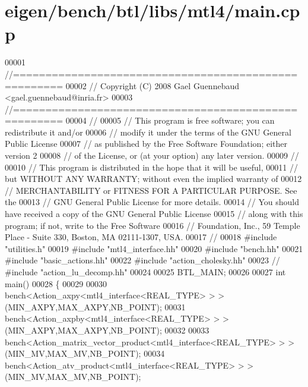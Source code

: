 \hypertarget{eigen_2bench_2btl_2libs_2mtl4_2main_8cpp_source}{}\section{eigen/bench/btl/libs/mtl4/main.cpp}
\label{eigen_2bench_2btl_2libs_2mtl4_2main_8cpp_source}

\begin{DoxyCode}
00001 \textcolor{comment}{//=====================================================}
00002 \textcolor{comment}{// Copyright (C) 2008 Gael Guennebaud <gael.guennebaud@inria.fr>}
00003 \textcolor{comment}{//=====================================================}
00004 \textcolor{comment}{//}
00005 \textcolor{comment}{// This program is free software; you can redistribute it and/or}
00006 \textcolor{comment}{// modify it under the terms of the GNU General Public License}
00007 \textcolor{comment}{// as published by the Free Software Foundation; either version 2}
00008 \textcolor{comment}{// of the License, or (at your option) any later version.}
00009 \textcolor{comment}{//}
00010 \textcolor{comment}{// This program is distributed in the hope that it will be useful,}
00011 \textcolor{comment}{// but WITHOUT ANY WARRANTY; without even the implied warranty of}
00012 \textcolor{comment}{// MERCHANTABILITY or FITNESS FOR A PARTICULAR PURPOSE.  See the}
00013 \textcolor{comment}{// GNU General Public License for more details.}
00014 \textcolor{comment}{// You should have received a copy of the GNU General Public License}
00015 \textcolor{comment}{// along with this program; if not, write to the Free Software}
00016 \textcolor{comment}{// Foundation, Inc., 59 Temple Place - Suite 330, Boston, MA  02111-1307, USA.}
00017 \textcolor{comment}{//}
00018 \textcolor{preprocessor}{#include "utilities.h"}
00019 \textcolor{preprocessor}{#include "mtl4\_interface.hh"}
00020 \textcolor{preprocessor}{#include "bench.hh"}
00021 \textcolor{preprocessor}{#include "basic\_actions.hh"}
00022 \textcolor{preprocessor}{#include "action\_cholesky.hh"}
00023 \textcolor{comment}{// #include "action\_lu\_decomp.hh"}
00024 
00025 BTL\_MAIN;
00026 
00027 \textcolor{keywordtype}{int} main()
00028 \{
00029 
00030   bench<Action\_axpy<mtl4\_interface<REAL\_TYPE> > >(MIN\_AXPY,MAX\_AXPY,NB\_POINT);
00031   bench<Action\_axpby<mtl4\_interface<REAL\_TYPE> > >(MIN\_AXPY,MAX\_AXPY,NB\_POINT);
00032 
00033   bench<Action\_matrix\_vector\_product<mtl4\_interface<REAL\_TYPE> > >(MIN\_MV,MAX\_MV,NB\_POINT);
00034   bench<Action\_atv\_product<mtl4\_interface<REAL\_TYPE> > >(MIN\_MV,MAX\_MV,NB\_POINT);

\end{DoxyCode}
